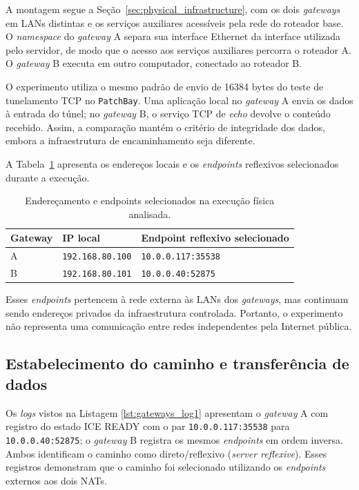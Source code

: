 A montagem segue a Seção~\ref{sec:physical_infrastructure}, com os dois \textit{gateways} em LANs distintas e os serviços auxiliares acessíveis pela rede do roteador base. O \textit{namespace} do \textit{gateway} A separa sua interface Ethernet da interface utilizada pelo servidor, de modo que o acesso aos serviços auxiliares percorra o roteador A. O \textit{gateway} B executa em outro computador, conectado ao roteador B.

O experimento utiliza o mesmo padrão de envio de 16384 bytes do teste de tunelamento TCP no \texttt{PatchBay}. Uma aplicação local no \textit{gateway} A envia os dados à entrada do túnel; no \textit{gateway} B, o serviço TCP de \textit{echo} devolve o conteúdo recebido. Assim, a comparação mantém o critério de integridade dos dados, embora a infraestrutura de encaminhamento seja diferente.

A Tabela~\ref{tab:physical_selected_endpoints} apresenta os endereços locais e os \textit{endpoints} reflexivos selecionados durante a execução.

\begin{table}[htbp]
    \centering
    \caption{Endereçamento e endpoints selecionados na execução física analisada.}
    \label{tab:physical_selected_endpoints}
    \begin{tabular}{@{}p{}p{}p{}@{}}
        \toprule
        \textbf{Gateway} & \textbf{IP local} & \textbf{Endpoint reflexivo selecionado} \\
        \midrule
        A & \texttt{192.168.80.100} & \texttt{10.0.0.117:35538} \\
        B & \texttt{192.168.80.101} & \texttt{10.0.0.40:52875} \\
        \bottomrule
    \end{tabular}
\end{table}

Esses \textit{endpoints} pertencem à rede externa às LANs dos \textit{gateways}, mas continuam sendo endereços privados da infraestrutura controlada. Portanto, o experimento não representa uma comunicação entre redes independentes pela Internet pública.

\subsection{Estabelecimento do caminho e transferência de dados}

Os \textit{logs} vistos na Listagem \ref{lst:gateways_log1} apresentam o \textit{gateway} A com registro do estado ICE READY com o par \texttt{10.0.0.117:35538} para \texttt{10.0.0.40:52875}; o \textit{gateway} B registra os mesmos \textit{endpoints} em ordem inversa. Ambos identificam o caminho como direto/reflexivo (\textit{server reflexive}). Esses registros demonstram que o caminho foi selecionado utilizando os \textit{endpoints} externos aos dois NATs.

